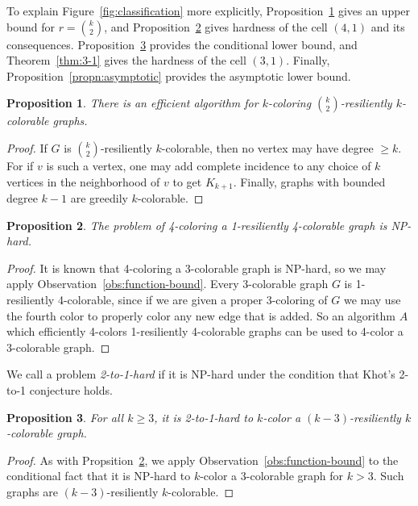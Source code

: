 \documentclass{article}[11pt]  %
\newtheorem{propn}{Proposition}
\begin{document}
To explain Figure~\ref{fig:classification} more explicitly,
Proposition~\ref{propn:k-choose-2-bound} gives an upper bound for $r=
\binom{k}{2}$, and Proposition~\ref{propn:4-1} gives hardness of the cell $(4,1)$
and its consequences. Proposition~\ref{propn:2-to-1-diagonal} provides the
conditional lower bound, and Theorem~\ref{thm:3-1} gives the hardness of the cell
$(3,1)$. Finally, Proposition~\ref{propn:asymptotic} provides the asymptotic
lower bound.

\begin{propn}\label{propn:k-choose-2-bound}
There is an efficient algorithm for $k$-coloring $\binom{k}{2}$-resiliently
$k$-colorable graphs.
\end{propn}
\begin{proof}
If $G$ is $\binom{k}{2}$-resiliently $k$-colorable, then no vertex may have
degree $ \geq k$. For if $v$ is such a vertex, one may add complete incidence to
any choice of $k$ vertices in the neighborhood of $v$ to get $K_{k+1}$. Finally,
graphs with bounded degree $k-1$ are greedily $k$-colorable. 
\end{proof}

\begin{propn}\label{propn:4-1}
The problem of 4-coloring a 1-resiliently 4-colorable graph is NP-hard.
\end{propn}
\begin{proof}
It is known that 4-coloring a 3-colorable graph is NP-hard, so we may apply
Observation~\ref{obs:function-bound}. Every 3-colorable graph $G$ is
1-resiliently 4-colorable, since if we are given a proper 3-coloring of $G$ we
may use the fourth color to properly color any new edge that is added. So an
algorithm $A$ which efficiently 4-colors 1-resiliently 4-colorable graphs can be
used to 4-color a 3-colorable graph.
\end{proof}

We call a problem \emph{2-to-1-hard} if it is NP-hard under the condition that
Khot's 2-to-1 conjecture holds.

\begin{propn}\label{propn:2-to-1-diagonal}
For all $k \geq 3$, it is 2-to-1-hard to $k$-color a $(k-3)$-resiliently
$k$-colorable graph. 
\end{propn}
\begin{proof}
As with Propsition~\ref{propn:4-1}, we apply Observation~\ref{obs:function-bound}
to the conditional fact that it is NP-hard to $k$-color a 3-colorable graph for
$k > 3$. Such graphs are $(k-3)$-resiliently $k$-colorable.
\end{proof}
\end{document}
